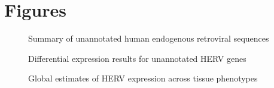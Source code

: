 \documentclass[11pt,letterpaper]{article}
\begin{document}
\FloatBarrier
\newpage
\section*{Figures}

\begin{figure}[ht]
  \caption{Summary of unannotated human endogenous retroviral sequences}
  \label{fig:pre_sum}
\end{figure}

\begin{figure}[ht]
  \caption{Differential expression results for unannotated HERV genes}
  \label{fig:dge_res}
\end{figure}

\begin{figure}[ht]
  \caption{Global estimates of HERV expression across tissue phenotypes}
  \label{fig:heat}
\end{figure}
\end{document}

